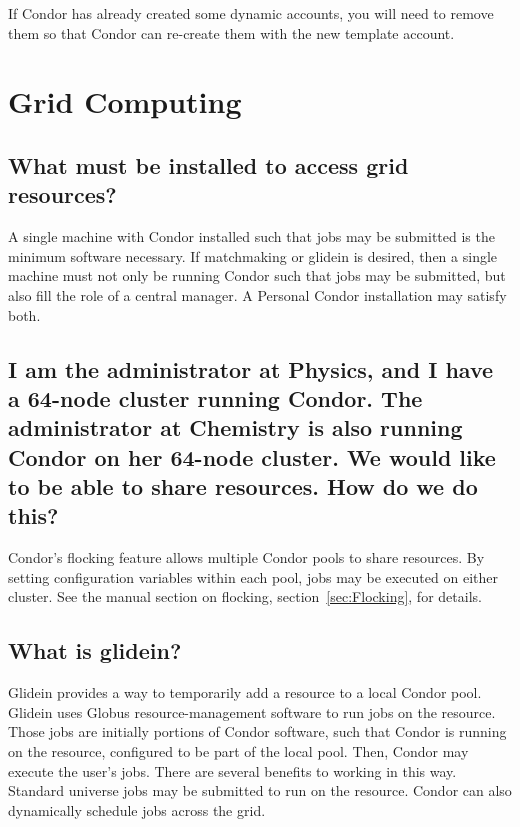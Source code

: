 If Condor has already created some dynamic accounts, you will need to remove
them so that Condor can re-create them with the new template account.

\section{Grid Computing}


\subsection*{What must be installed to access grid resources?}
A single machine with Condor installed such that jobs may
be submitted is the minimum software necessary.
If matchmaking or glidein is desired,
then a single machine must not only be running Condor
such that jobs may be submitted,
but also fill the role of a central manager.
A Personal Condor installation may satisfy both.

\subsection*{I am the administrator at Physics, and I have a 64-node cluster
running Condor.
The administrator at Chemistry is also running Condor on her 64-node cluster.
We would like to be able to share resources.
How do we do this?}

Condor's flocking feature
allows multiple Condor pools to share resources.
By setting configuration variables within each pool,
jobs may be executed on either cluster.
See the manual section on flocking, section~\ref{sec:Flocking},
for details.

\subsection*{What is glidein?}

Glidein provides a way to temporarily add a resource
to a local Condor pool.
Glidein uses Globus resource-management software to run jobs
on the resource.
Those jobs are initially portions of Condor
software, such that Condor is running on the resource,
configured to be part of the local pool.
Then, Condor may execute the user's jobs.
There are several benefits to working in this way.
Standard universe jobs may be submitted to run on the resource.
Condor can also dynamically schedule jobs across the grid.

